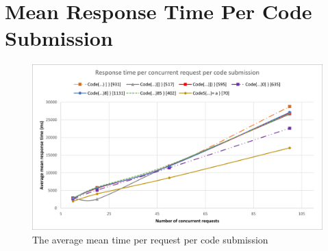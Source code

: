 \chapter{Mean Response Time Per Code Submission} \label{chap:AdditionalPlots}
\begin{figure}[H]
    \centering
    \includegraphics[width=\textwidth,height=\textheight,keepaspectratio]{images/Aveage per code.png}
    \caption{The average mean time per request per code submission}
    \label{fig:averagePerCode}
\end{figure}